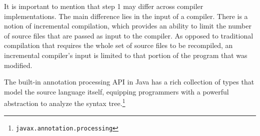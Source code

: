 It is important to mention that step 1 may differ across compiler implementations. The main difference lies in the input of a compiler. There is a notion of incremental compilation, which provides an ability to limit the number of source files that are passed as input to the compiler. As opposed to traditional compilation that requires the whole set of source files to be recompiled, an incremental compiler’s input is limited to that portion of the program that was modified.

\n

The built-in annotation processing API in Java has a rich collection of types that model the source language itself, equipping programmers with a powerful abstraction to analyze the syntax tree.\footnote{\texttt{javax.annotation.processing}}
